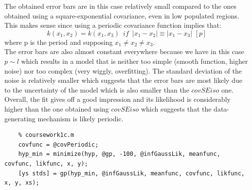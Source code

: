 \documentclass[a4paper,11pt]{article}
\begin{document}
The obtained error bars are in this case relatively small compared to the ones obtained using a square-exponential covariance, even in low populated regions. This makes sense since using a periodic covariance function implies that:
\[
k(x_1,x_2)=k(x_1,x_3)\,\,\, if \,\,\, | x_1 - x_2 | \equiv | x_1 -x_3| \, \,[p]
\]
where p is the period and supposing $x_1 \neq x_2 \neq x_3$.\\
The error bars are also almost constant everywhere because we have in this case $p\sim l$ which results in a model that is neither too simple (smooth function, higher noise) nor too complex (very wiggly, overfitting).
The standard deviation of the noise is relatively smaller which suggests that the error bars are most likely due to the uncertainty of the model which is also smaller than the $covSEiso$ one. Overall, the fit gives off a good impression and its likelihood is considerably higher than the one obtained using $covSEiso$ which suggests that the data-generating mechanism is likely periodic.
\begin{lstlisting}
	% coursework1c.m
	covfunc = @covPeriodic;
	hyp_min = minimize(hyp, @gp, -100, @infGaussLik, meanfunc, covfunc, likfunc, x, y);
	[ys stds] = gp(hyp_min, @infGaussLik, meanfunc, covfunc, likfunc, x, y, xs);
\end{lstlisting}
\end{document}
